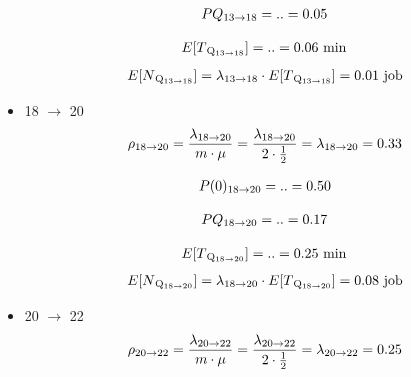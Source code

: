 \documentclass[a4paper, 12pt]{article}
\begin{document}
\begin{itemize}
\[
\begin{aligned}
  PQ\textsubscript{13$\rightarrow$18} = .. = 0.05 
\end{aligned}
\]

\[
\begin{aligned}
  E[T\textsubscript{Q\textsubscript{13$\rightarrow$18}}] = .. = 0.06 \text{ min} 
\end{aligned}
\]
\[
\begin{aligned}
  E[N\textsubscript{Q\textsubscript{13$\rightarrow$18}}] = \lambda\textsubscript{13$\rightarrow$18}
\cdot E[T\textsubscript{Q\textsubscript{13$\rightarrow$18}}] = 0.01 \text{ job} 
\end{aligned}
\]


\item 18 $\rightarrow$ 20
\[
\begin{aligned}
  \rho\textsubscript{18$\rightarrow$20} = \frac{\lambda\textsubscript{18$\rightarrow$20}}{m \cdot \mu}
= \frac{\lambda\textsubscript{18$\rightarrow$20}}{2 \cdot \frac{1}{2}} =\lambda\textsubscript{18$\rightarrow$20} = 0.33
\end{aligned}
\]

\[
\begin{aligned}
  P(0)\textsubscript{18$\rightarrow$20} = .. = 0.50 
\end{aligned}
\]

\[
\begin{aligned}
  PQ\textsubscript{18$\rightarrow$20} = .. = 0.17 
\end{aligned}
\]

\[
\begin{aligned}
  E[T\textsubscript{Q\textsubscript{18$\rightarrow$20}}] = .. = 0.25 \text{ min} 
\end{aligned}
\]
\[
\begin{aligned}
  E[N\textsubscript{Q\textsubscript{18$\rightarrow$20}}] = \lambda\textsubscript{18$\rightarrow$20}
\cdot E[T\textsubscript{Q\textsubscript{18$\rightarrow$20}}] = 0.08 \text{ job} 
\end{aligned}
\]


\item 20 $\rightarrow$ 22
\[
\begin{aligned}
  \rho\textsubscript{20$\rightarrow$22} = \frac{\lambda\textsubscript{20$\rightarrow$22}}{m \cdot \mu}
= \frac{\lambda\textsubscript{20$\rightarrow$22}}{2 \cdot \frac{1}{2}} =\lambda\textsubscript{20$\rightarrow$22} = 0.25
\end{aligned}
\]


\end{itemize}
\end{document}

